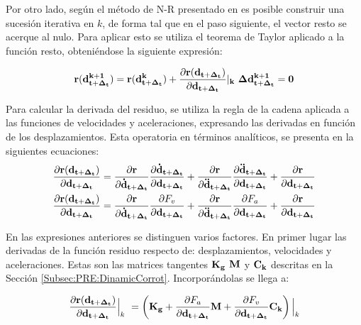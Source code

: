 Por otro lado, según el método de N-R presentado en \cite{quarteroni2010numerical} es posible construir una sucesión iterativa en  $k$, de forma tal que en el paso siguiente, el vector resto se acerque al nulo. Para aplicar esto se utiliza el teorema de Taylor aplicado a la función resto, obteniéndose la siguiente expresión:

\begin{equation}\label{Eq:MET:Residuo}
	\bf{r}(\bf{d}^{k+1}_{t+\Delta_t})=\bf{r}(\bf{d}^k_{t+\Delta_t}) +
	\frac{\partial  \bf{r}(\bf{d}_{t+\Delta_t})}{\partial
		\bf{d}_{t+\Delta_t}}|_k~\Delta \bf{d}^{k+1}_{t+\Delta_t}=0
\end{equation}

Para calcular la derivada del residuo, se utiliza la regla de la cadena aplicada a las funciones de velocidades y aceleraciones, expresando las derivadas en función de los desplazamientos. Esta operatoria en términos analíticos, se presenta en la siguientes ecuaciones: 
\begin{equation}\label{Eq:MET:DerivadaResiduo}
	\begin{split}
	\frac{\partial  \bf{r}(\bf{d}_{t+\Delta_t})}{\partial
	\bf{d}_{t+\Delta_t}}&=\frac{\partial  \bf{r}}{\partial
	\bf{\dot{d}}_{t+\Delta_t}}\frac{\partial 
	\bf{\bf{\dot{d}}_{t+\Delta_t}}}{\partial \bf{{d}}_{t+\Delta_t}}+ \frac{\partial 
	\bf{r}}{\partial \bf{\ddot{d}}_{t+\Delta_t}}\frac{\partial 
	\bf{\bf{\ddot{d}}_{t+\Delta_t}}}{\partial \bf{{d}}_{t+\Delta_t}}+\frac{\partial 
	\bf{r}}{\partial \bf{{d}}_{t+\Delta_t}}\\
	\frac{\partial  \bf{r}(\bf{d}_{t+\Delta_t})}{\partial \bf{d}_{t+\Delta_t}}&= \frac{\partial  \bf{r}}{\partial\bf{\dot{d}}_{t+\Delta_t}}\frac{\partial F_v}{\partial \bf{{d}}_{t+\Delta_t}}+\frac{\partial  \bf{r}}{\partial\bf{\ddot{d}}_{t+\Delta_t}}\frac{\partial F_a}{\partial \bf{{d}}_{t+\Delta_t}}+\frac{\partial 
		\bf{r}}{\partial \bf{{d}}_{t+\Delta_t}}
	\end{split}
\end{equation}

En las expresiones anteriores se distinguen varios factores. En primer lugar las derivadas de la función residuo respecto de: desplazamientos, velocidades y aceleraciones. Estas son las matrices tangentes $\bf{K_g}$ $\bf{M}$ y $\bf{C_k}$ descritas en la Sección \ref{Subsec:PRE:DinamicCorrot}. Incorporándolas se llega a:

\begin{equation}\label{Eq:PRE:DerivadaResiduo}
	\frac{\partial  \bf{r}(\bf{d}_{t+\Delta_t})}{\partial \bf{d}_{t+\Delta_t}}\Big|_k~
	= \left (\bf{K}_g+\frac{\partial\text{$ F_a$}}{\partial \bf{{d}}_{t+\Delta_t}}\bf{M} + \frac{\partial\text{$ F_v$}}{\partial \bf{{d}}_{t+\Delta_t}}\bf{C}_k \right)\Big|_k
\end{equation}

